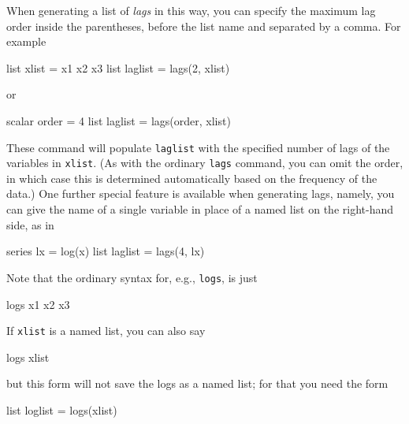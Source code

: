 When generating a list of \textit{lags} in this way, you can specify
the maximum lag order inside the parentheses, before the list name and
separated by a comma.  For example
%
\begin{code}
list xlist = x1 x2 x3
list laglist = lags(2, xlist)
\end{code}
%
or
%
\begin{code}
scalar order = 4
list laglist = lags(order, xlist)
\end{code}

These command will populate \texttt{laglist} with the specified number
of lags of the variables in \texttt{xlist}.  (As with the ordinary
\texttt{lags} command, you can omit the order, in which case this is
determined automatically based on the frequency of the data.)  One
further special feature is available when generating lags, namely, you
can give the name of a single variable in place of a named list on the
right-hand side, as in
%
\begin{code}
series lx = log(x)
list laglist = lags(4, lx)
\end{code}

Note that the ordinary syntax for, e.g., \texttt{logs}, is just
%
\begin{code}
logs x1 x2 x3
\end{code}
%
If \texttt{xlist} is a named list, you can also say
%
\begin{code}
logs xlist
\end{code}
%
but this form will not save the logs as a named list; for that you
need the form
%
\begin{code}
list loglist = logs(xlist)
\end{code}










    

